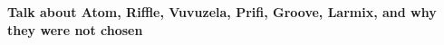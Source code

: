 \documentclass[a4paper,11pt,oneside]{report}
\begin{document}
\textbf{Talk about Atom, Riffle, Vuvuzela, Prifi, Groove, Larmix, and why they were not chosen}


\end{document}
